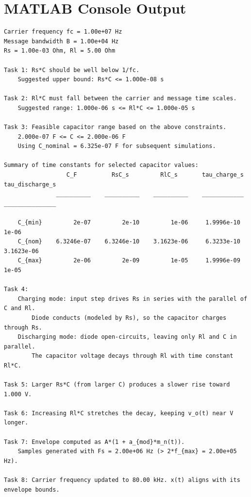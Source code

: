 \documentclass[12pt]{article}
\begin{document}
\section*{MATLAB Console Output}
\begin{verbatim}
Carrier frequency fc = 1.00e+07 Hz
Message bandwidth B = 1.00e+04 Hz
Rs = 1.00e-03 Ohm, Rl = 5.00 Ohm

Task 1: Rs*C should be well below 1/fc.
    Suggested upper bound: Rs*C <= 1.000e-08 s

Task 2: Rl*C must fall between the carrier and message time scales.
    Suggested range: 1.000e-06 s <= Rl*C <= 1.000e-05 s

Task 3: Feasible capacitor range based on the above constraints.
    2.000e-07 F <= C <= 2.000e-06 F
    Using C_nominal = 6.325e-07 F for subsequent simulations.

Summary of time constants for selected capacitor values:
                  C_F          RsC_s         RlC_s       tau_charge_s    tau_discharge_s
               __________    __________    __________    ____________    _______________

    C_{min}         2e-07         2e-10         1e-06     1.9996e-10            1e-06
    C_{nom}    6.3246e-07    6.3246e-10    3.1623e-06     6.3233e-10       3.1623e-06
    C_{max}         2e-06         2e-09         1e-05     1.9996e-09            1e-05

Task 4:
    Charging mode: input step drives Rs in series with the parallel of C and Rl.
        Diode conducts (modeled by Rs), so the capacitor charges through Rs.
    Discharging mode: diode open-circuits, leaving only Rl and C in parallel.
        The capacitor voltage decays through Rl with time constant Rl*C.

Task 5: Larger Rs*C (from larger C) produces a slower rise toward 1.000 V.

Task 6: Increasing Rl*C stretches the decay, keeping v_o(t) near V longer.

Task 7: Envelope computed as A*(1 + a_{mod}*m_n(t)).
    Samples generated with Fs = 2.00e+06 Hz (> 2*f_{max} = 2.00e+05 Hz).

Task 8: Carrier frequency updated to 80.00 kHz. x(t) aligns with its envelope bounds.
\end{verbatim}

\clearpage
\end{document}
